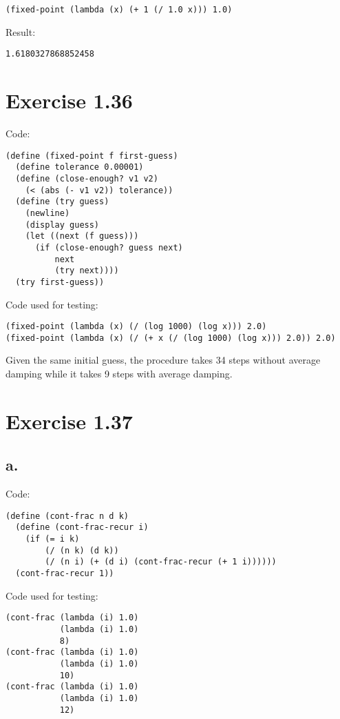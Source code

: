 \documentclass[../main.tex]{subfiles}
\begin{document}
\begin{lstlisting}
(fixed-point (lambda (x) (+ 1 (/ 1.0 x))) 1.0)
\end{lstlisting}

Result:

\begin{lstlisting}
1.6180327868852458
\end{lstlisting}

\section{Exercise 1.36}

Code:

\begin{lstlisting}
(define (fixed-point f first-guess)
  (define tolerance 0.00001)
  (define (close-enough? v1 v2)
    (< (abs (- v1 v2)) tolerance))
  (define (try guess)
    (newline)
    (display guess)
    (let ((next (f guess)))
      (if (close-enough? guess next)
          next
          (try next))))
  (try first-guess))
\end{lstlisting}

Code used for testing:

\begin{lstlisting}
(fixed-point (lambda (x) (/ (log 1000) (log x))) 2.0)
(fixed-point (lambda (x) (/ (+ x (/ (log 1000) (log x))) 2.0)) 2.0)
\end{lstlisting}

Given the same initial guess, the procedure takes 34 steps without
 average damping while it takes 9 steps with average damping.

\section{Exercise 1.37}

\subsection*{a.}

Code:

\begin{lstlisting}
(define (cont-frac n d k)
  (define (cont-frac-recur i)
    (if (= i k)
        (/ (n k) (d k))
        (/ (n i) (+ (d i) (cont-frac-recur (+ 1 i))))))
  (cont-frac-recur 1))
\end{lstlisting}

Code used for testing:

\begin{lstlisting}
(cont-frac (lambda (i) 1.0)
           (lambda (i) 1.0)
           8)
(cont-frac (lambda (i) 1.0)
           (lambda (i) 1.0)
           10)
(cont-frac (lambda (i) 1.0)
           (lambda (i) 1.0)
           12)
\end{lstlisting}
\end{document}

